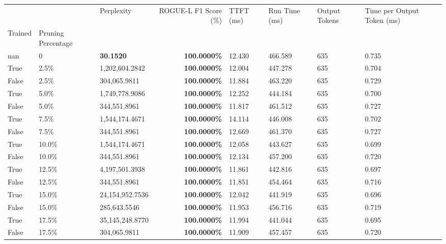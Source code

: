 \begin{table}[H]
\label{tab:evaluation-pipeline-9}
\begin{tabular}{lllrllll}
\toprule
 &  & Perplexity & ROGUE-L F1 Score (\%) & TTFT (ms) & Run Time (ms) & Output Tokens & Time per Output Token (ms) \\
Trained & Pruning Percentage &  &  &  &  &  &  \\
\midrule
nan & 0 & \bfseries 30.1520 & \bfseries 100.0000\% & 12.430 & 466.589 & 635 & 0.735 \\
\cline{1-8}
True & 2.5\% & 1,202,604.2842 & \bfseries \color{red} 100.0000\% & 12.004 & 447.278 & 635 & 0.704 \\
\cline{1-8}
False & 2.5\% & 304,065.9811 & \bfseries \color{red} 100.0000\% & 11.884 & 463.220 & 635 & 0.729 \\
\cline{1-8}
True & 5.0\% & 1,749,778.9086 & \bfseries \color{red} 100.0000\% & 12.252 & 444.184 & 635 & 0.700 \\
\cline{1-8}
False & 5.0\% & 344,551.8961 & \bfseries \color{red} 100.0000\% & 11.817 & 461.512 & 635 & 0.727 \\
\cline{1-8}
True & 7.5\% & 1,544,174.4671 & \bfseries \color{red} 100.0000\% & 14.114 & 446.008 & 635 & 0.702 \\
\cline{1-8}
False & 7.5\% & 344,551.8961 & \bfseries \color{red} 100.0000\% & 12.669 & 461.370 & 635 & 0.727 \\
\cline{1-8}
True & 10.0\% & 1,544,174.4671 & \bfseries \color{red} 100.0000\% & 12.058 & 443.627 & 635 & 0.699 \\
\cline{1-8}
False & 10.0\% & 344,551.8961 & \bfseries \color{red} 100.0000\% & 12.134 & 457.200 & 635 & 0.720 \\
\cline{1-8}
True & 12.5\% & 4,197,501.3938 & \bfseries \color{red} 100.0000\% & 11.861 & 442.816 & 635 & 0.697 \\
\cline{1-8}
False & 12.5\% & 344,551.8961 & \bfseries \color{red} 100.0000\% & 11.851 & 454.464 & 635 & 0.716 \\
\cline{1-8}
True & 15.0\% & 24,154,952.7536 & \bfseries \color{red} 100.0000\% & 12.042 & 441.919 & 635 & 0.696 \\
\cline{1-8}
False & 15.0\% & \color{red} 285,643.5546 & \bfseries \color{red} 100.0000\% & 11.953 & 456.716 & 635 & 0.719 \\
\cline{1-8}
True & 17.5\% & 35,145,248.8770 & \bfseries \color{red} 100.0000\% & 11.994 & 441.044 & 635 & 0.695 \\
\cline{1-8}
False & 17.5\% & 304,065.9811 & \bfseries \color{red} 100.0000\% & 11.909 & 457.457 & 635 & 0.720 \\

\end{tabular}
\end{table}
